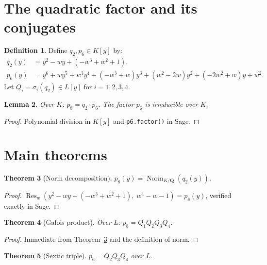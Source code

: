 \documentclass[12pt]{amsart}
\newtheorem{theorem}{Theorem}[section]
\newtheorem{lemma}[theorem]{Lemma}
\theoremstyle{definition}
\newtheorem{definition}[theorem]{Definition}
\newcommand{\QQ}{\mathbf{Q}}
\DeclareMathOperator{\Norm}{Norm}
\begin{document}
\section{The quadratic factor and its conjugates}

\begin{definition}
Define $q_2, p_6 \in K[y]$ by:
\begin{align}
  q_2(y) &= y^2 - wy + (-w^3 + w^2 + 1), \label{eq:q2}\\
  p_6(y) &= y^6 + wy^5 + w^3y^4 + (-w^3+w)y^3
             + (w^2-2w)y^2 + (-2w^2+w)y + w^2. \label{eq:p6}
\end{align}
Let $Q_i = \sigma_i(q_2) \in L[y]$ for $i = 1,2,3,4$.
\end{definition}

\begin{lemma}\label{lem:p8-factor}
Over $K$: $p_8 = q_2 \cdot p_6$. The factor $p_6$ is irreducible over $K$.
\end{lemma}

\begin{proof}
Polynomial division in $K[y]$ and \texttt{p6.factor()} in Sage.
\end{proof}

\section{Main theorems}

\begin{theorem}[Norm decomposition]\label{thm:norm-octic}
$p_8(y) = \Norm_{K/\QQ}(q_2(y))$.
\end{theorem}

\begin{proof}
$\operatorname{Res}_w(y^2 - wy + (-w^3+w^2+1),\; w^4-w-1) = p_8(y)$,
verified exactly in Sage.
\end{proof}

\begin{theorem}[Galois product]\label{thm:galois-product}
Over $L$: $p_8 = Q_1 Q_2 Q_3 Q_4$.
\end{theorem}

\begin{proof}
Immediate from Theorem~\ref{thm:norm-octic} and the definition of norm.
\end{proof}

\begin{theorem}[Sextic triple]\label{thm:sextic}
$p_6 = Q_2 Q_3 Q_4$ over $L$.
\end{theorem}
\end{document}
